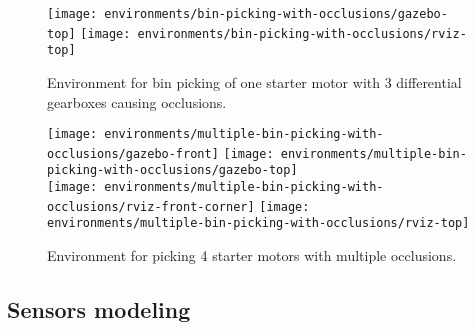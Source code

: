 \begin{figure}[H]
	\centering
	\texttt{[image: environments/bin-picking-with-occlusions/gazebo-top]}
	\texttt{[image: environments/bin-picking-with-occlusions/rviz-top]}
	\caption{Environment for bin picking of one starter motor with 3 differential gearboxes causing occlusions.}
	\label{fig:bin-picking-with-occlusions-environment}
\end{figure}

\begin{figure}[H]
	\centering
	\texttt{[image: environments/multiple-bin-picking-with-occlusions/gazebo-front]}
	\texttt{[image: environments/multiple-bin-picking-with-occlusions/gazebo-top]}\\
	\texttt{[image: environments/multiple-bin-picking-with-occlusions/rviz-front-corner]}
	\texttt{[image: environments/multiple-bin-picking-with-occlusions/rviz-top]}
	\caption{Environment for picking 4 starter motors with multiple occlusions.}
	\label{fig:multiple-bin-picking-with-occlusions-environment}
\end{figure}


\subsection{Sensors modeling}

